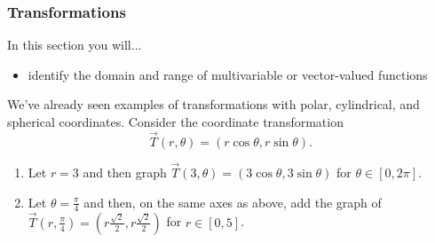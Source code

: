 \documentclass[10pt,]{book}
\theoremstyle{plain}
\theoremstyle{definition}
\theoremstyle{definition}
\theoremstyle{definition}
\theoremstyle{definition}
\theoremstyle{definition}
\numberwithin{equation}{section}
\begin{document}
\subsubsection[{Transformations}]{Transformations}\label{subsubsection-1}
In this section you will... \leavevmode%
\begin{itemize}[label=\textbullet]
\item{}identify the domain and range of multivariable or vector-valued functions%
\end{itemize}
%
\par
We've already seen examples of transformations with polar, cylindrical, and spherical coordinates.%
Consider the coordinate transformation%
\begin{equation*}
\vec T(r,\theta) = (r\cos\theta,r\sin\theta).
\end{equation*}
\leavevmode%
\begin{enumerate}
\item\hypertarget{li-65}{}Let \(r=3\) and then graph \(\vec T(3,\theta)=(3\cos\theta,3\sin\theta)\) for \(\theta\in[0,2\pi]\).%
\item\hypertarget{li-66}{}Let \(\theta=\frac{\pi}{4}\) and then, on the same axes as above, add the graph of \(\vec T\left(r,\frac{\pi}{4}\right)=\left(r\frac{\sqrt 2}{2},r \frac{\sqrt 2}{2}\right)\) for \(r\in[0,5]\).%
\end{enumerate}
%
\end{document}
